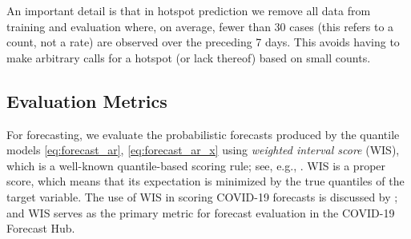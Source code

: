\documentclass[9pt,twocolumn,twoside,lineno]{pnas-new}
\begin{document}
An important detail is that in hotspot prediction we remove all data from
training and evaluation where, on average, fewer than 30 cases (this refers to a
count, not a rate) are observed over the preceding 7 days. This avoids having to
make arbitrary calls for a hotspot (or lack thereof) based on small counts.   

\subsection{Evaluation Metrics}

For forecasting, we evaluate the probabilistic forecasts produced by the
quantile models \eqref{eq:forecast_ar}, \eqref{eq:forecast_ar_x} using
\textit{weighted interval score} (WIS), which is a well-known quantile-based
scoring rule; see, e.g., \cite{Gneiting:2007}.  WIS is a proper score, which
means that its expectation is minimized by the true quantiles of the target
variable.  The use of WIS in scoring COVID-19 forecasts is discussed by
\cite{Bracher:2021}; and WIS serves as the primary metric for forecast
evaluation in the COVID-19 Forecast Hub.
\end{document}
